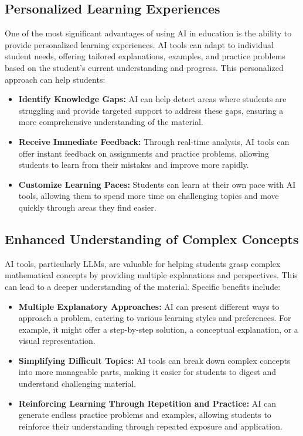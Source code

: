 \documentclass{article}
\begin{document}
\subsection{Personalized Learning Experiences}

One of the most significant advantages of using AI in education is the ability to provide personalized learning experiences. AI tools can adapt to individual student needs, offering tailored explanations, examples, and practice problems based on the student's current understanding and progress. This personalized approach can help students:

\begin{itemize}
    \item \textbf{Identify Knowledge Gaps:} AI can help detect areas where students are struggling and provide targeted support to address these gaps, ensuring a more comprehensive understanding of the material.
    \item \textbf{Receive Immediate Feedback:} Through real-time analysis, AI tools can offer instant feedback on assignments and practice problems, allowing students to learn from their mistakes and improve more rapidly.
    \item \textbf{Customize Learning Paces:} Students can learn at their own pace with AI tools, allowing them to spend more time on challenging topics and move quickly through areas they find easier.
\end{itemize}

\subsection{Enhanced Understanding of Complex Concepts}

AI tools, particularly LLMs, are valuable for helping students grasp complex mathematical concepts by providing multiple explanations and perspectives. This can lead to a deeper understanding of the material. Specific benefits include:

\begin{itemize}
    \item \textbf{Multiple Explanatory Approaches:} AI can present different ways to approach a problem, catering to various learning styles and preferences. For example, it might offer a step-by-step solution, a conceptual explanation, or a visual representation.
    \item \textbf{Simplifying Difficult Topics:} AI tools can break down complex concepts into more manageable parts, making it easier for students to digest and understand challenging material.
    \item \textbf{Reinforcing Learning Through Repetition and Practice:} AI can generate endless practice problems and examples, allowing students to reinforce their understanding through repeated exposure and application.
\end{itemize}
\end{document}
